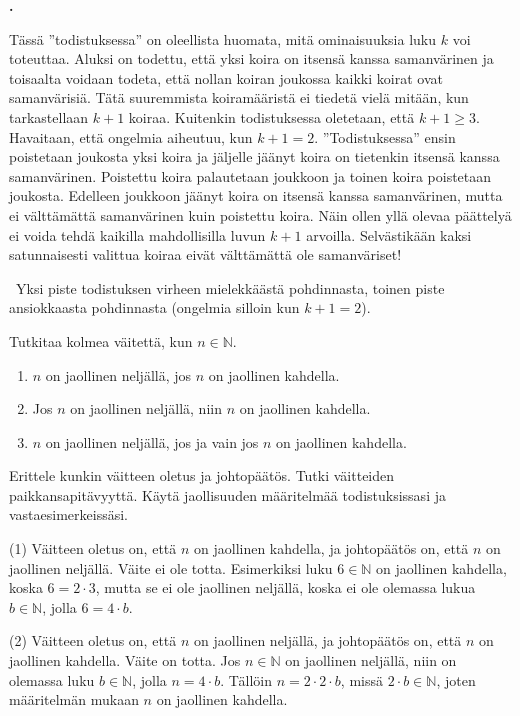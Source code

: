\documentclass[11pt,a4paper,oneside,notitlepage,final]{article}
\newcommand{\N}{\mathbb{N}}
\newcounter{harjnro}
\newenvironment{harjlist}
  {\begin{list}{\kor{\arabic{harjnro}.}}
    {\usecounter{harjnro}
      \setlength{\labelwidth}{0em}
      \setlength{\labelsep}{0.4em}
      \setlength{\leftmargin}{0pt}
      \setlength{\parsep}{5pt}
      \setlength{\itemindent}{0.4em}
      \setlength{\topsep}{0.5\parskip}
      \setlength{\itemsep}{0.75\parskip}
    }
  }
  {\end{list}}
\newcommand{\kor}[1]{\textbf{#1}}
\begin{document}
\begin{harjlist}
\vspace{0.4cm}
\ratkaisu
Tässä ''todistuksessa'' on oleellista huomata, mitä ominaisuuksia luku $k$ voi toteuttaa. 
Aluksi on todettu, että yksi koira on itsensä kanssa samanvärinen ja toisaalta
voidaan todeta, että nollan koiran joukossa kaikki koirat ovat samanvärisiä. 
Tätä suuremmista koiramääristä ei tiedetä vielä mitään, kun tarkastellaan $k+1$ koiraa.
Kuitenkin todistuksessa oletetaan, että $k + 1 \ge 3$. Havaitaan, että ongelmia aiheutuu, 
kun $k + 1 = 2$. ''Todistuksessa'' ensin poistetaan joukosta yksi koira ja jäljelle 
jäänyt koira on tietenkin itsensä kanssa samanvärinen. Poistettu koira palautetaan 
joukkoon ja toinen koira poistetaan joukosta. Edelleen joukkoon jäänyt koira on 
itsensä kanssa samanvärinen, mutta ei välttämättä samanvärinen kuin poistettu koira. 
Näin ollen yllä olevaa päättelyä ei voida tehdä kaikilla mahdollisilla luvun $k+1$ 
arvoilla. Selvästikään kaksi satunnaisesti valittua koiraa eivät välttämättä ole 
samanväriset! 

\arvostelu \
Yksi piste todistuksen virheen mielekkäästä pohdinnasta, toinen piste ansiokkaasta pohdinnasta 
(ongelmia silloin kun $k+1=2$).

\item[5.] 
Tutkitaa kolmea väitettä, kun $n\in \N$. 
\begin{enumerate}
\item[(1)]
$n$ on jaollinen neljällä, jos $n$ on jaollinen kahdella.
\item[(2)]
Jos $n$ on jaollinen neljällä, niin $n$ on jaollinen kahdella.
\item[(3)]
$n$ on jaollinen neljällä, jos ja vain jos $n$ on jaollinen kahdella.
\end{enumerate}
Erittele kunkin väitteen oletus ja johtopäätös. Tutki väitteiden paikkansapitävyyttä. 
Käytä jaollisuuden määritelmää todistuksissasi ja vastaesimerkeissäsi.

\vspace{0.4cm}
\ratkaisu
(1) Väitteen oletus on, että $n$ on jaollinen kahdella, ja johtopäätös on, että 
$n$ on jaollinen neljällä. Väite ei ole totta. Esimerkiksi luku $6\in\N$ on jaollinen
kahdella, koska $6=2\cdot 3$, mutta se ei ole jaollinen neljällä, koska ei ole
olemassa lukua $b\in\N$, jolla $6=4\cdot b$.

(2) Väitteen oletus on, että $n$ on jaollinen neljällä, ja johtopäätös on, että 
$n$ on jaollinen kahdella. Väite on totta. Jos $n\in\N$ on jaollinen neljällä, niin
on olemassa luku $b\in\N$, jolla $n=4\cdot b$. Tällöin $n=2\cdot 2\cdot b$, missä
$2\cdot b\in\N$, joten määritelmän mukaan $n$ on jaollinen kahdella.


\end{harjlist}
\end{document}
